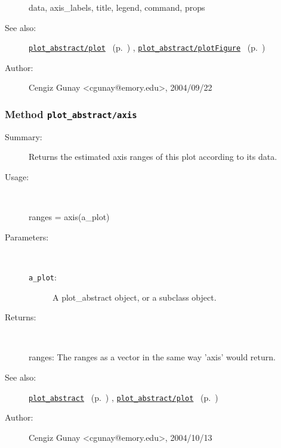 \begin{description}
	data, axis\_labels, title, legend, command, props
%
%
\item[See also:]%
\hyperlink{ref_plot_abstract__plot}{\texttt{plot\_abstract/plot}}%
\ (p.~\pageref{ref_plot_abstract__plot})%
%
, \hyperlink{ref_plot_abstract__plotFigure}{\texttt{plot\_abstract/plotFigure}}%
\ (p.~\pageref{ref_plot_abstract__plotFigure})%
%
%
\item[Author:]%
Cengiz Gunay <cgunay@emory.edu>, 2004/09/22
%
\end{description}
\methodline%
\subsubsection[Method \texttt{axis}]{Method \texttt{plot\_abstract/axis}}%
%
\label{ref_plot_abstract__axis}%
\hypertarget{ref_plot_abstract__axis}{}%
\begin{description}
\item[Summary:]Returns the estimated axis ranges of this plot according to its data.
%
\item[Usage:]~%
\begin{lyxcode}%
ranges = axis(a\_plot)
%
\end{lyxcode}%
%
%
\item[Parameters:]~
\begin{description}%
\item[\texttt{a\_plot}:]
 A plot\_abstract object, or a subclass object.
\end{description}%
%
\item[Returns:
]~

	ranges: The ranges as a vector in the same way 'axis' would return.
%
%
\item[See also:]%
\hyperlink{ref_plot_abstract}{\texttt{plot\_abstract}}%
\ (p.~\pageref{ref_plot_abstract})%
%
, \hyperlink{ref_plot_abstract__plot}{\texttt{plot\_abstract/plot}}%
\ (p.~\pageref{ref_plot_abstract__plot})%
%
%
\item[Author:]%
Cengiz Gunay <cgunay@emory.edu>, 2004/10/13
%
\end{description}
\methodline%
